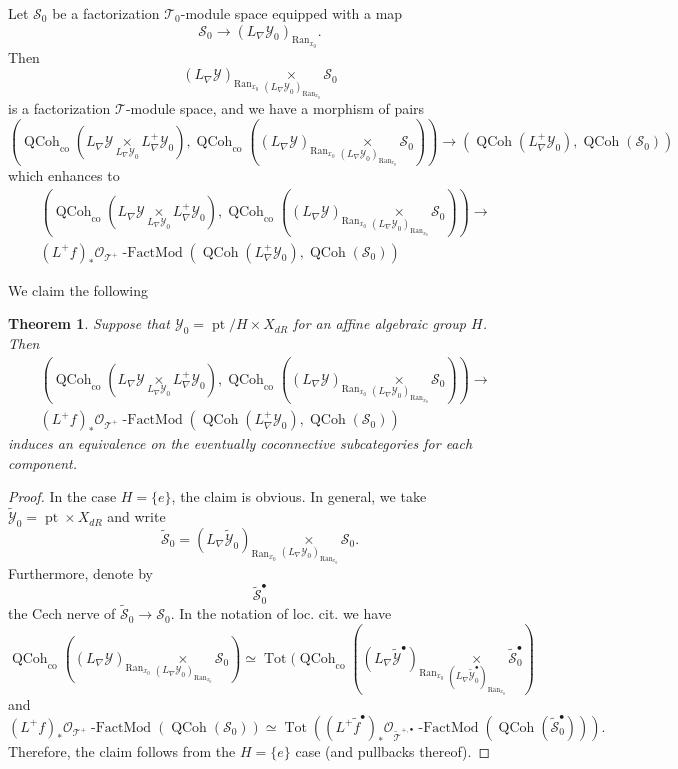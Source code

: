 \documentclass[10pt]{amsart}
\newtheorem{thm}[subsubsection]{Theorem}
\theoremstyle{remark}
\newcommand{\on}[1]{\operatorname{#1}}
\newcommand{\QCoh}{\on{QCoh}}
\newcommand{\Ran}{\on{Ran}}
\begin{document}
Let $\mathcal{S}_0$ be a factorization $\mathcal{T}_0$-module space equipped with a map
$$
\mathcal{S}_0 \to (L_{\nabla}\mathcal{Y}_0)_{\Ran_{x_0}}.
$$
Then
$$
(L_{\nabla}\mathcal{Y})_{\Ran_{x_0}} \underset{(L_{\nabla}\mathcal{Y}_0)_{\Ran_{x_0}}}{\times} \mathcal{S}_0
$$
is a factorization $\mathcal{T}$-module space, and we have a morphism of pairs
$$
(\QCoh_{\on{co}}(L_{\nabla}\mathcal{Y} \underset{L_{\nabla}\mathcal{Y}_0}{\times} L_{\nabla}^+\mathcal{Y}_0), \QCoh_{\on{co}}((L_{\nabla}\mathcal{Y})_{\Ran_{x_0}} \underset{(L_{\nabla}\mathcal{Y}_0)_{\Ran_{x_0}}}{\times} \mathcal{S}_0)) \to (\QCoh(L_{\nabla}^+\mathcal{Y}_0), \QCoh(\mathcal{S}_0))
$$
which enhances to
\begin{align}
&(\QCoh_{\on{co}}(L_{\nabla}\mathcal{Y} \underset{L_{\nabla}\mathcal{Y}_0}{\times} L_{\nabla}^+\mathcal{Y}_0), \QCoh_{\on{co}}((L_{\nabla}\mathcal{Y})_{\Ran_{x_0}} \underset{(L_{\nabla}\mathcal{Y}_0)_{\Ran_{x_0}}}{\times} \mathcal{S}_0)) \to \\ &(L^+f)_*\mathcal{O}_{\mathcal{T}^+}\on{-FactMod}(\QCoh(L_{\nabla}^+\mathcal{Y}_0), \QCoh(\mathcal{S}_0))
\end{align}

We claim the following
\begin{thm} \label{approximation}
    Suppose that $\mathcal{Y}_0 = \on{pt}/H \times X_{dR}$ for an affine algebraic group $H$. Then 
    \begin{align}
    &(\QCoh_{\on{co}}(L_{\nabla}\mathcal{Y} \underset{L_{\nabla}\mathcal{Y}_0}{\times} L_{\nabla}^+\mathcal{Y}_0), \QCoh_{\on{co}}((L_{\nabla}\mathcal{Y})_{\Ran_{x_0}} \underset{(L_{\nabla}\mathcal{Y}_0)_{\Ran_{x_0}}}{\times} \mathcal{S}_0)) \to \\ &(L^+f)_*\mathcal{O}_{\mathcal{T}^+}\on{-FactMod}(\QCoh(L_{\nabla}^+\mathcal{Y}_0), \QCoh(\mathcal{S}_0))
    \end{align}
    induces an equivalence on the eventually coconnective subcategories for each component.
\end{thm}
\begin{proof}
    In the case $H = \{e\}$, the claim is obvious. In general, we take $\tilde{\mathcal{Y}}_0 = \on{pt} \times X_{dR}$ and write
    $$
    \tilde{\mathcal{S}}_0 = (L_{\nabla}\tilde{\mathcal{Y}}_0)_{\Ran_{x_0}} \underset{(L_{\nabla}\mathcal{Y}_0)_{\Ran_{x_0}}}{\times} \mathcal{S}_0.
    $$
    Furthermore, denote by
    $$
    \tilde{\mathcal{S}}_0^{\bullet}
    $$
    the Cech nerve of $\tilde{\mathcal{S}}_0 \to \mathcal{S}_0$.
    In the notation of loc. cit. we have
    $$
    \QCoh_{\on{co}}((L_{\nabla}\mathcal{Y})_{\Ran_{x_0}} \underset{(L_{\nabla}\mathcal{Y}_0)_{\Ran_{x_0}}}{\times} \mathcal{S}_0) \simeq \on{Tot}(\QCoh_{\on{co}}((L_{\nabla}\tilde{\mathcal{Y}}^{\bullet})_{\Ran_{x_0}} \underset{(L_{\nabla}\tilde{\mathcal{Y}}_0^{\bullet})_{\Ran_{x_0}}}{\times} \tilde{\mathcal{S}}_0^{\bullet})
    $$
    and
    $$
    (L^+f)_*\mathcal{O}_{\mathcal{T}^+}\on{-FactMod}(\QCoh(\mathcal{S}_0)) \simeq \on{Tot}((L^+\tilde{f}^{\bullet})_*\mathcal{O}_{\tilde{\mathcal{T}}^{+, \bullet}}\on{-FactMod}(\QCoh(\tilde{\mathcal{S}}_0^{\bullet}))).
    $$
    Therefore, the claim follows from the $H = \{e\}$ case (and pullbacks thereof).
    
\end{proof}
\end{document}
